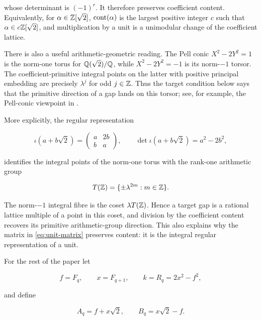 whose determinant is $(-1)^r$. It therefore preserves coefficient content.
Equivalently, for $\alpha\in\mathbb{Z}[\sqrt2]$, $\operatorname{cont}\!\left(\alpha\right)$ is the largest
positive integer $c$ such that $\alpha\in c\mathbb{Z}[\sqrt2]$, and multiplication
by a unit is a unimodular change of the coefficient lattice.

There is also a useful arithmetic-geometric reading. The Pell conic
$X^2-2Y^2=1$ is the norm-one torus for $\mathbb{Q}(\sqrt2)/\mathbb{Q}$, while
$X^2-2Y^2=-1$ is its norm-$-1$ torsor. The coefficient-primitive integral
points on the latter with positive principal embedding are precisely
$\lambda^j$ for odd $j\in\mathbb{Z}$.
Thus the target condition below says that the primitive direction of a gap
lands on this torsor; see, for example, the Pell-conic viewpoint in
\cite[Chapter~8]{Lemmermeyer2021}.

More explicitly, the regular representation

\begin{equation}
 \iota(a+b\sqrt2)=
 \begin{pmatrix}a&2b\\ b&a\end{pmatrix},
 \qquad
 \det\iota(a+b\sqrt2)=a^2-2b^2,
 \label{eq:regular-representation}
\end{equation}

identifies the integral points of the norm-one torus with the rank-one
arithmetic group

\begin{equation}
 T(\mathbb{Z})=\{\pm\lambda^{2m}:m\in\mathbb{Z}\}.
 \label{eq:norm-one-arithmetic-group}
\end{equation}

The norm-$-1$ integral fibre is the coset $\lambda T(\mathbb{Z})$. Hence a target
gap is a rational lattice multiple of a point in this coset, and division by
the coefficient content recovers its primitive arithmetic-group direction.
This also explains why the matrix in \cref{eq:unit-matrix} preserves content:
it is the integral regular representation of a unit.

For the rest of the paper let

\begin{equation}
 f=F_q,
 \qquad
 x=F_{q+1},
 \qquad
 k=R_q=2x^2-f^2,
 \label{eq:f-x-k}
\end{equation}

and define

\begin{equation}
 A_q=f+x\sqrt2,
 \qquad
 B_q=x\sqrt2-f.
 \label{eq:A-B}
\end{equation}

